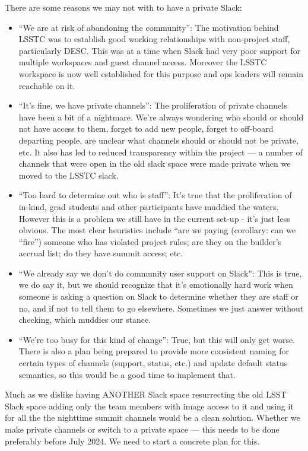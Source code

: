 There are some reasons we may not with to have a private Slack:

\begin{itemize}
\item ``We are at risk of abandoning the community'': The motivation behind LSSTC was to establish good working relationships with non-project staff, particularly DESC. This was at a time when Slack had very poor support for multiple workspaces and guest channel access. Moreover the LSSTC workspace is now well established for this purpose and ops leaders will remain reachable on it.
\item  ``It's fine, we have private channels'': The proliferation of private channels have been a bit of a nightmare. We're always wondering who should or should not have access to them, forget to add new people, forget to off-board departing people, are unclear what channels  should or should not be private, etc. It also has led to reduced transparency within the project --- a number of channels that were open in the old slack space were made private when we moved to the LSSTC slack.
\item  ``Too hard to determine out who is staff'': It's true that the proliferation of in-kind, grad students and other participants have muddied the waters. However this is a problem we still have in the current set-up -  it's just less obvious. The most clear heuristics include “are we paying (corollary: can we “fire”) someone who has violated project rules; are they on the builder's accrual list; do they have summit access; etc.
\item  ``We already say we don't do community user support on Slack'': This is true, we do say it, but we should recognize that it's emotionally hard work when someone is asking a question on Slack to determine whether they are staff or no, and if not to tell them to go elsewhere. Sometimes we just answer without checking, which muddies our stance.
\item  ``We're too busy for this kind of change'': True, but this will only get worse. There is also a plan being prepared to provide more consistent naming for certain types of channels (support, status, etc.) and update default status semantics,  so this would be a good time to implement that.
\end{itemize}


Much as we dislike having ANOTHER Slack space resurrecting the old LSST Slack space adding only the team members with image access to it and using it for all the the nighttime summit channels would be a clean solution.
Whether we make private channels or switch to a private space --- this needs to be done preferably before July 2024.
We need to start a concrete plan for this.

